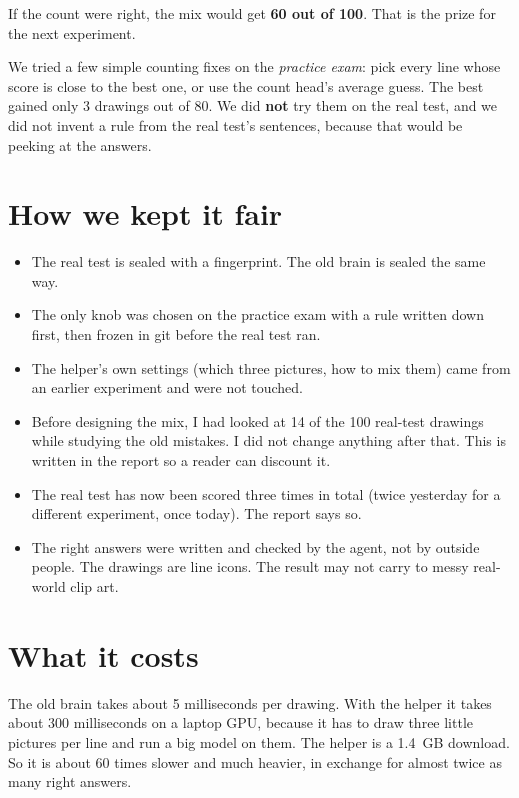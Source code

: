 \documentclass[11pt,a4paper]{article}
\begin{document}
If the count were right, the mix would get \textbf{60 out of 100}. That is the prize for the next experiment.

We tried a few simple counting fixes on the \emph{practice exam}: pick every line whose score is close to the best one, or use the count head's average guess.
The best gained only 3 drawings out of 80.
We did \textbf{not} try them on the real test, and we did not invent a rule from the real test's sentences, because that would be peeking at the answers.

\section*{How we kept it fair}

\begin{itemize}[leftmargin=1.6em]
  \item The real test is sealed with a fingerprint. The old brain is sealed the same way.
  \item The only knob was chosen on the practice exam with a rule written down first, then frozen in git before the real test ran.
  \item The helper's own settings (which three pictures, how to mix them) came from an earlier experiment and were not touched.
  \item Before designing the mix, I had looked at 14 of the 100 real-test drawings while studying the old mistakes. I did not change anything after that. This is written in the report so a reader can discount it.
  \item The real test has now been scored three times in total (twice yesterday for a different experiment, once today). The report says so.
  \item The right answers were written and checked by the agent, not by outside people. The drawings are line icons. The result may not carry to messy real-world clip art.
\end{itemize}

\section*{What it costs}

The old brain takes about 5 milliseconds per drawing.
With the helper it takes about 300 milliseconds on a laptop GPU, because it has to draw three little pictures per line and run a big model on them.
The helper is a 1.4~GB download.
So it is about 60 times slower and much heavier, in exchange for almost twice as many right answers.
\end{document}
